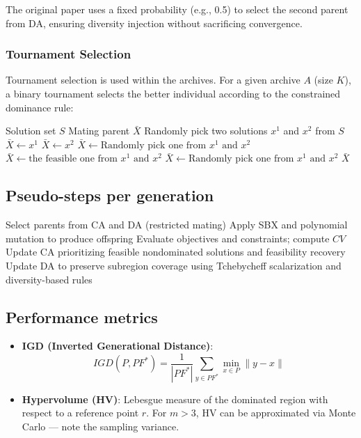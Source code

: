 \documentclass[12pt]{article}
\begin{document}
The original paper uses a fixed probability (e.g., 0.5) to select the second parent from DA, ensuring diversity injection without sacrificing convergence.

\newpage
\subsubsection{Tournament Selection}
Tournament selection is used within the archives. For a given archive \(A\) (size \(K\)), a binary tournament selects the better individual according to the constrained dominance rule:
\begin{algorithm}
\caption{Tournament Selection}
\label{alg:tournament}
\begin{algorithmic}[1]
\Require Solution set $S$
\Ensure Mating parent $\bar{X}$
\State Randomly pick two solutions $x^1$ and $x^2$ from $S$
        \State $\bar{X} \gets x^1$
        \State $\bar{X} \gets x^2$
    \Else
        \State $\bar{X} \gets \text{Randomly pick one from } x^1 \text{ and } x^2$
    \EndIf
\Else
        \State $\bar{X} \gets \text{the feasible one from } x^1 \text{ and } x^2$
    \Else
        \State $\bar{X} \gets \text{Randomly pick one from } x^1 \text{ and } x^2$
    \EndIf
\EndIf
\State \Return $\bar{X}$
\end{algorithmic}
\end{algorithm}

\subsection{Pseudo-steps per generation}
\begin{algorithm}[H]
\caption{C-TAEA generation loop}
\begin{algorithmic}[1]
\State Select parents from CA and DA (restricted mating)
\State Apply SBX and polynomial mutation to produce offspring
\State Evaluate objectives and constraints; compute $CV$
\State Update CA prioritizing feasible nondominated solutions and feasibility recovery
\State Update DA to preserve subregion coverage using Tchebycheff scalarization and diversity-based rules
\end{algorithmic}
\end{algorithm}


\subsection{Performance metrics}
\begin{itemize}
    \item \textbf{IGD (Inverted Generational Distance)}:
    \[
    IGD(P,PF^*)=\frac{1}{|PF^*|}\sum_{y\in PF^*} \min_{x\in P} \|y-x\|
    \]
    \item \textbf{Hypervolume (HV)}: Lebesgue measure of the dominated region with respect to a reference point $r$. For $m>3$, HV can be approximated via Monte Carlo — note the sampling variance.
\end{itemize}
\end{document}
